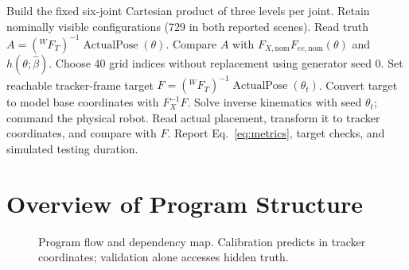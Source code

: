 \documentclass[11pt]{article}
\begin{document}
\begin{algorithm}[H]
\caption{Independent forward and inverse validation (Steps 9--10)}
\begin{algorithmic}[1]
\State Build the fixed six-joint Cartesian product of three levels per joint.
\State Retain nominally visible configurations (729 in both reported scenes).
 \State Read truth $A=({}^{W}F_T)^{-1}\operatorname{ActualPose}(\theta)$.
 \State Compare $A$ with $F_{X,\mathrm{nom}}F_{ee,\mathrm{nom}}(\theta)$ and $h(\theta;\widehat\beta)$.
\EndFor
\State Choose 40 grid indices without replacement using generator seed 0.
 \State Set reachable tracker-frame target $F=({}^{W}F_T)^{-1}\operatorname{ActualPose}(\theta_t)$.
  \State Convert target to model base coordinates with $F_X^{-1}F$.
  \State Solve inverse kinematics with seed $\theta_t$; command the physical robot.
  \State Read actual placement, transform it to tracker coordinates, and compare with $F$.
 \EndFor
\EndFor
\State Report Eq.~\eqref{eq:metrics}, target checks, and simulated testing duration.
\end{algorithmic}
\end{algorithm}

\section{Overview of Program Structure}
\label{sec:program-structure}
\begin{figure}[H]\centering
{}
\caption{Program flow and dependency map. Calibration predicts in tracker coordinates; validation alone accesses hidden truth.}
\end{figure}
\end{document}
